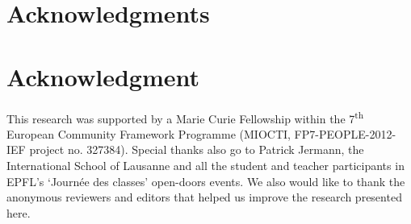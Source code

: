 \documentclass[10pt,journal,compsoc]{IEEEtran}
\begin{document}
\ifCLASSOPTIONcompsoc
  \section*{Acknowledgments}
\else
  \section*{Acknowledgment}
\fi

This research was supported by a Marie Curie Fellowship within the 7\textsuperscript{th} European Community Framework Programme (MIOCTI, FP7-PEOPLE-2012-IEF project no. 327384). Special thanks also go to Patrick Jermann, the International School of Lausanne and all the student and teacher participants in EPFL's `Journ\'ee des classes' open-doors events. We also would like to thank the anonymous reviewers and editors that helped us improve the research presented here.



\ifCLASSOPTIONcaptionsoff
  \newpage
\fi







%
%
\end{document}
